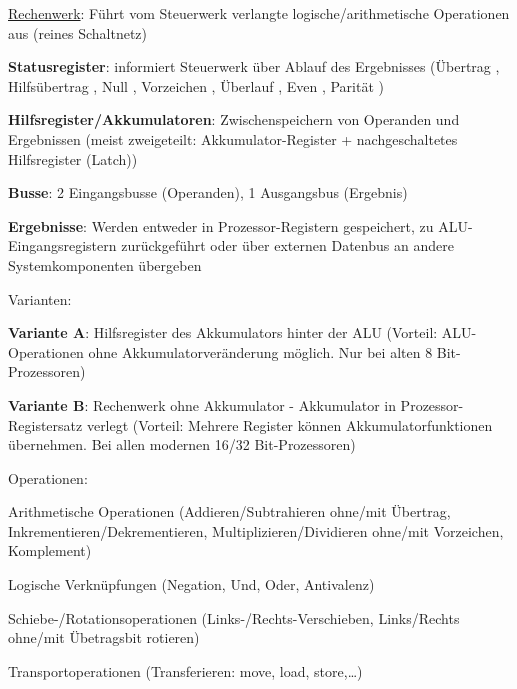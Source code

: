 \begin{items}
	\item \underline{\textcolor{green!60!black}{Rechenwerk}}: Führt vom Steuerwerk verlangte logische/arithmetische Operationen aus (reines Schaltnetz)
	\begin{enumeration}
		\item \textbf{Statusregister}: informiert Steuerwerk über Ablauf des Ergebnisses (Übertrag , Hilfsübertrag , Null , Vorzeichen , Überlauf , Even , Parität )
		\item \textbf{Hilfsregister/Akkumulatoren}: Zwischenspeichern von Operanden und Ergebnissen (meist zweigeteilt: Akkumulator-Register  + nachgeschaltetes Hilfsregister  (Latch))
		\item \textbf{Busse}: 2 Eingangsbusse (Operanden), 1 Ausgangsbus (Ergebnis)
		\item \textbf{Ergebnisse}: Werden entweder in Prozessor-Registern gespeichert, zu ALU-Eingangsregistern zurückgeführt oder über externen Datenbus an andere Systemkomponenten übergeben
	\end{enumeration}
	\item Varianten:
	\begin{enumeration}
		\item \textbf{Variante A}: Hilfsregister des Akkumulators hinter der ALU (Vorteil: ALU-Operationen ohne Akkumulatorveränderung möglich. Nur bei alten 8 Bit-Prozessoren)
		\item \textbf{Variante B}: Rechenwerk ohne Akkumulator - Akkumulator in Prozessor-Registersatz verlegt (Vorteil: Mehrere Register können Akkumulatorfunktionen übernehmen. Bei allen modernen 16/32 Bit-Prozessoren)
	\end{enumeration}

	\newpage

	\item Operationen:
	\begin{enumeration}
		\item Arithmetische Operationen (Addieren/Subtrahieren ohne/mit Übertrag, Inkrementieren/Dekrementieren, Multiplizieren/Dividieren ohne/mit Vorzeichen, Komplement)
		\item Logische Verknüpfungen (Negation, Und, Oder, Antivalenz)
		\item Schiebe-/Rotationsoperationen (Links-/Rechts-Verschieben, Links/Rechts ohne/mit Übetragsbit rotieren)
		\item Transportoperationen (Transferieren: move, load, store,\dots)
	\end{enumeration}


\end{items}
